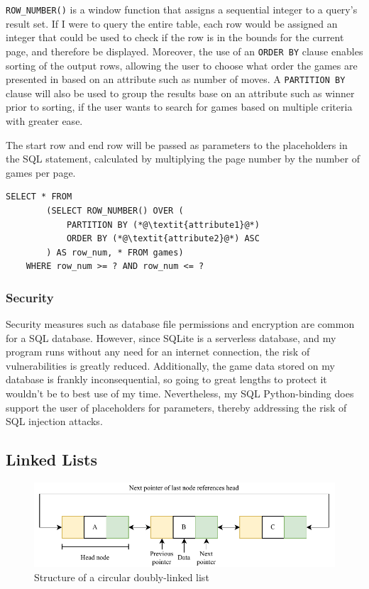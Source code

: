 \documentclass[../main/main.tex]{subfiles}
\begin{document}
\lstinline[language=sqlite]{ROW_NUMBER()} is a window function that assigns a sequential integer to a query's result set. If I were to query the entire table, each row would be assigned an integer that could be used to check if the row is in the bounds for the current page, and therefore be displayed. Moreover, the use of an \lstinline[language=sqlite]{ORDER BY} clause enables sorting of the output rows, allowing the user to choose what order the games are presented in based on an attribute such as number of moves. A \lstinline[language=sqlite]{PARTITION BY} clause will also be used to group the results base on an attribute such as winner prior to sorting, if the user wants to search for games based on multiple criteria with greater ease.

The start row and end row will be passed as parameters to the placeholders in the SQL statement, calculated by multiplying the page number by the number of games per page.

\begin{lstlisting}[language=sqlite, frame=lines]
    SELECT * FROM
        (SELECT ROW_NUMBER() OVER (
            PARTITION BY (*@\textit{attribute1}@*)
            ORDER BY (*@\textit{attribute2}@*) ASC
        ) AS row_num, * FROM games)
    WHERE row_num >= ? AND row_num <= ?
\end{lstlisting}

\subsubsection*{Security}
Security measures such as database file permissions and encryption are common for a SQL database. However, since SQLite is a serverless database, and my program runs without any need for an internet connection, the risk of vulnerabilities is greatly reduced. Additionally, the game data stored on my database is frankly inconsequential, so going to great lengths to protect it wouldn't be to best use of my time. Nevertheless, my SQL Python-binding does support the user of placeholders for parameters, thereby addressing the risk of SQL injection attacks.

\subsection{Linked Lists}
\label{sec:linked-lists}
\begin{figure}[H]
    \centering
    \includegraphics[width=\columnwidth]{../design/assets/linked_list.pdf}
    \caption{Structure of a circular doubly-linked list}
    \label{fig:linked-list}
\end{figure}
\end{document}
